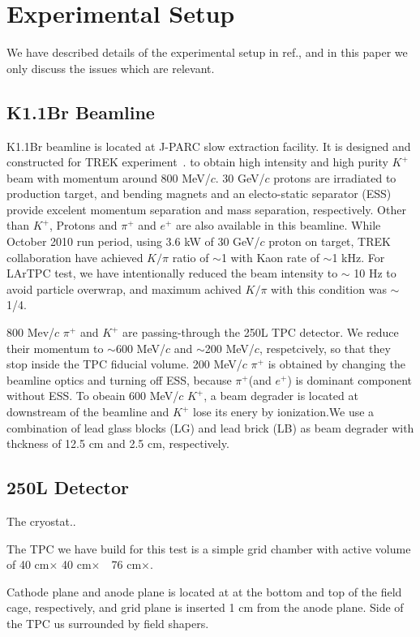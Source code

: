 \section{Experimental Setup}

We have described details of the experimental setup in ref.\cite{Araoka:2011pw},
and in this paper we only discuss the issues which are relevant.

\subsection{K1.1Br Beamline}
K1.1Br beamline is located at J-PARC slow extraction facility.
It is designed and constructed for TREK experiment~\cite{ref:TREK}. 
to obtain high intensity and high purity $K^+$ beam with momentum around 800 MeV/$c$.
30 GeV/$c$ protons are irradiated to production target, and bending magnets
and an electo-static separator (ESS) provide excelent momentum separation and mass separation, respectively.
Other than $K^+$, Protons and $\pi^+$ and $e^+$ are also available in this beamline. 
While October 2010 run period, using 3.6 kW of 30 GeV/$c$ proton on target, 
TREK collaboration have achieved $K/\pi$ ratio of $\sim$1 with Kaon rate of $\sim$1 kHz.
For LArTPC test, we have intentionally reduced the beam intensity to $\sim$ 10 Hz 
to avoid particle overwrap, and maximum achived  $K/\pi$ with this condition was $\sim$1/4.

800 Mev/$c$ $\pi^+$ and $K^+$ are passing-through the 250L TPC detector.
We reduce their momentum to $\sim$600 MeV/$c$ and $\sim$200 MeV/$c$, respetcively,
so that they stop inside the TPC fiducial volume.
200 MeV/$c$ $\pi^+$ is obtained by changing the beamline optics and turning off ESS,
because $\pi^+$(and $e^+$) is dominant component without ESS.
To obeain 600 MeV/$c$ $K^+$, a beam degrader is located at downstream of the beamline
and $K^+$ lose its enery by ionization.We use a combination of lead glass blocks (LG) 
and lead brick (LB) as beam degrader with thckness of 12.5 cm and 2.5 cm, respectively.

\subsection{250L Detector}

The cryostat..

The TPC we have build for this test is a simple grid chamber
with active volume of 40 cm$\times$ 40 cm$\times$　76 cm$\times$.

Cathode plane and anode plane is located at 
at the bottom and top of the field cage, respectively,
and grid plane is inserted 1 cm from the anode plane.
Side of the TPC us surrounded by field shapers.

